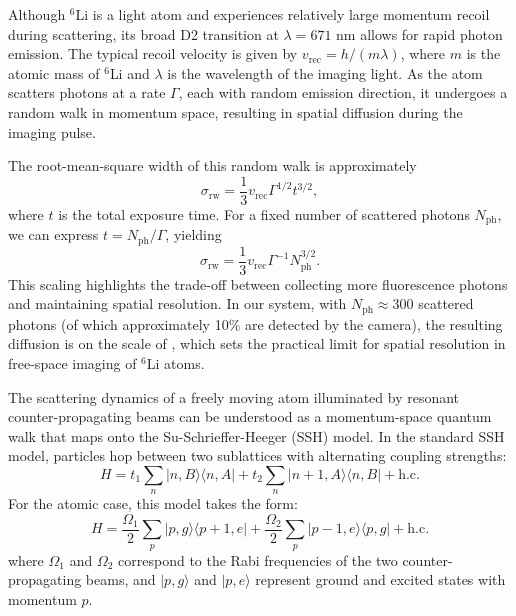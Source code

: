 Although $^6$Li is a light atom and experiences relatively large momentum recoil during scattering, its broad D2 transition at $\lambda = 671$ nm allows for rapid photon emission. The typical recoil velocity is given by $v_\mathrm{rec} = h/(m\lambda)$, where $m$ is the atomic mass of $^6$Li and $\lambda$ is the wavelength of the imaging light. As the atom scatters photons at a rate $\Gamma$, each with random emission direction, it undergoes a random walk in momentum space, resulting in spatial diffusion during the imaging pulse.

The root-mean-square width of this random walk is approximately \cite{kruip_design_2024}
\begin{equation}
\sigma_\mathrm{rw} = \frac{1}{3} v_\mathrm{rec} \Gamma^{1/2} t^{3/2},
\label{eq:sigmarw}
\end{equation}
where $t$ is the total exposure time. For a fixed number of scattered photons $N_\mathrm{ph}$, we can express $t = N_\mathrm{ph}/\Gamma$, yielding
\begin{equation}
\sigma_\mathrm{rw} = \frac{1}{3} v_\mathrm{rec} \Gamma^{-1} N_\mathrm{ph}^{3/2}.
\end{equation}
This scaling highlights the trade-off between collecting more fluorescence photons and maintaining spatial resolution. In our system, with $N_\mathrm{ph} \approx 300$ scattered photons (of which approximately 10\% are detected by the camera), the resulting diffusion is on the scale of , which sets the practical limit for spatial resolution in free-space imaging of $^6$Li atoms.


The scattering dynamics of a freely moving atom illuminated by resonant counter-propagating beams can be understood as a momentum-space quantum walk that maps onto the Su-Schrieffer-Heeger (SSH) model. In the standard SSH model, particles hop between two sublattices with alternating coupling strengths:
\begin{equation}
H = t_1 \sum_n |n,B\rangle \langle n,A| + t_2 \sum_n |n+1,A\rangle \langle n,B| + \text{h.c.}
\end{equation}
For the atomic case, this model takes the form:
\begin{equation}
H = \frac{\Omega_1}{2} \sum_p |p,g\rangle \langle p+1,e| + \frac{\Omega_2}{2} \sum_p |p-1,e\rangle \langle p,g| + \text{h.c.}
\end{equation}
where $\Omega_1$ and $\Omega_2$ correspond to the Rabi frequencies of the two counter-propagating beams, and $|p,g\rangle$ and $|p,e\rangle$ represent ground and excited states with momentum $p$.

